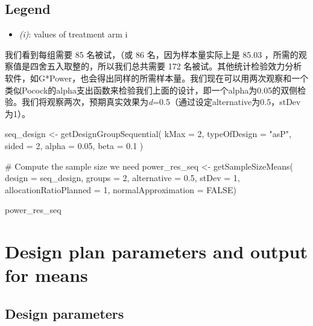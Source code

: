 \documentclass[
  letterpaper,
  DIV=11,
  numbers=noendperiod]{scrreprt}
\newenvironment{Shaded}{\begin{snugshade}}{\end{snugshade}}
\newcommand{\AttributeTok}[1]{\textcolor[rgb]{0.40,0.45,0.13}{#1}}
\newcommand{\CommentTok}[1]{\textcolor[rgb]{0.37,0.37,0.37}{#1}}
\newcommand{\ConstantTok}[1]{\textcolor[rgb]{0.56,0.35,0.01}{#1}}
\newcommand{\DecValTok}[1]{\textcolor[rgb]{0.68,0.00,0.00}{#1}}
\newcommand{\FloatTok}[1]{\textcolor[rgb]{0.68,0.00,0.00}{#1}}
\newcommand{\FunctionTok}[1]{\textcolor[rgb]{0.28,0.35,0.67}{#1}}
\newcommand{\NormalTok}[1]{\textcolor[rgb]{0.00,0.23,0.31}{#1}}
\newcommand{\OtherTok}[1]{\textcolor[rgb]{0.00,0.23,0.31}{#1}}
\newcommand{\StringTok}[1]{\textcolor[rgb]{0.13,0.47,0.30}{#1}}
\providecommand{\tightlist}{%
  \setlength{\itemsep}{0pt}\setlength{\parskip}{0pt}}\usepackage{longtable,booktabs,array}
\begin{document}
\hypertarget{legend}{%
\subsection{Legend}\label{legend}}

\begin{itemize}
\tightlist
\item
  \emph{(i)}: values of treatment arm i
\end{itemize}

我们看到每组需要 85 名被试，（或 86 名，因为样本量实际上是 85.03
，所需的观察值是四舍五入取整的，所以我们总共需要 172
名被试。其他统计检验效力分析软件，如G*Power，也会得出同样的所需样本量。我们现在可以用两次观察和一个类似Pocock的alpha支出函数来检验我们上面的设计，即一个alpha为0.05的双侧检验。我们将观察两次，预期真实效果为\emph{d}=0.5（通过设定alternative为0.5，stDev为1）。

\begin{Shaded}
\begin{Highlighting}[]
\NormalTok{seq\_design }\OtherTok{\textless{}{-}} \FunctionTok{getDesignGroupSequential}\NormalTok{(}
  \AttributeTok{kMax =} \DecValTok{2}\NormalTok{,}
  \AttributeTok{typeOfDesign =} \StringTok{"asP"}\NormalTok{,}
  \AttributeTok{sided =} \DecValTok{2}\NormalTok{,}
  \AttributeTok{alpha =} \FloatTok{0.05}\NormalTok{,}
  \AttributeTok{beta =} \FloatTok{0.1}
\NormalTok{  )}

\CommentTok{\# Compute the sample size we need}
\NormalTok{power\_res\_seq }\OtherTok{\textless{}{-}} \FunctionTok{getSampleSizeMeans}\NormalTok{(}
  \AttributeTok{design =}\NormalTok{ seq\_design,}
  \AttributeTok{groups =} \DecValTok{2}\NormalTok{,}
  \AttributeTok{alternative =} \FloatTok{0.5}\NormalTok{, }
  \AttributeTok{stDev =} \DecValTok{1}\NormalTok{, }
  \AttributeTok{allocationRatioPlanned =} \DecValTok{1}\NormalTok{,}
  \AttributeTok{normalApproximation =} \ConstantTok{FALSE}\NormalTok{)}

\NormalTok{power\_res\_seq}
\end{Highlighting}
\end{Shaded}

\hypertarget{design-plan-parameters-and-output-for-means-1}{%
\section{Design plan parameters and output for
means}\label{design-plan-parameters-and-output-for-means-1}}

\hypertarget{design-parameters-1}{%
\subsection{Design parameters}\label{design-parameters-1}}
\end{document}
